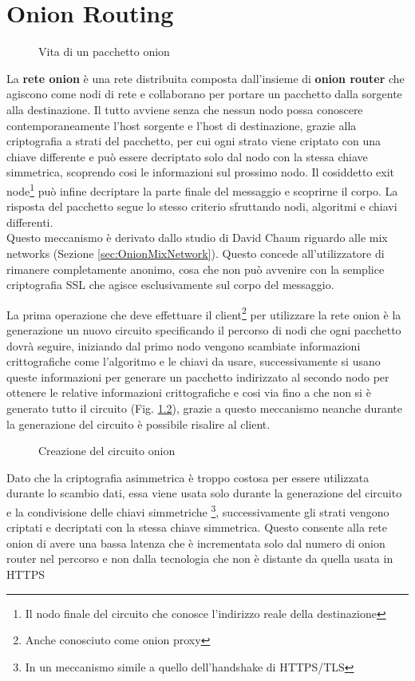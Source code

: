 \chapter{Onion Routing}
\label{chap:Capitolo1}

\begin{figure}[htpb!]
    \centering
    
    \caption{Vita di un pacchetto onion}
    \label{fig:routing}
\end{figure}

La \textbf{rete onion} è una rete distribuita composta dall'insieme di \textbf{onion router} che agiscono come nodi di rete e collaborano per portare un pacchetto dalla sorgente alla destinazione. 
Il tutto avviene senza che nessun nodo possa conoscere contemporaneamente l'host sorgente e l'host di destinazione, grazie alla criptografia a strati del pacchetto, per cui ogni strato viene criptato con una chiave differente e può essere decriptato solo dal nodo con la stessa chiave simmetrica, scoprendo cosi le informazioni sul prossimo nodo. 
Il cosiddetto exit node\footnote{Il nodo finale del circuito che conosce l'indirizzo reale della destinazione} può infine decriptare la parte finale del messaggio e scoprirne il corpo. 
La risposta del pacchetto segue lo stesso criterio sfruttando nodi, algoritmi e chiavi differenti. \\
Questo meccanismo è derivato dallo studio di David Chaum riguardo alle mix networks (Sezione \ref{sec:OnionMixNetwork}).
Questo concede all'utilizzatore di rimanere completamente anonimo, cosa che non può avvenire con la semplice criptografia SSL che agisce esclusivamente sul corpo del messaggio.

\newpage La prima operazione che deve effettuare il client\footnote{Anche conosciuto come onion proxy} per utilizzare la rete onion è la generazione un nuovo circuito specificando il percorso di nodi che ogni pacchetto dovrà seguire, iniziando dal primo nodo vengono scambiate informazioni crittografiche come l'algoritmo e le chiavi da usare, successivamente si usano queste informazioni per generare un pacchetto indirizzato al secondo nodo per ottenere le relative informazioni crittografiche e cosi via fino a che non si è generato tutto il circuito (Fig. \ref{fig:circuitCreation}), grazie a questo meccanismo neanche durante la generazione del circuito è possibile risalire al client. 

\begin{figure}[htpb!]
    \centering
    
    \caption{Creazione del circuito onion}
    \label{fig:circuitCreation}
\end{figure}
Dato che la criptografia asimmetrica è troppo costosa per essere utilizzata durante lo scambio dati, essa viene usata solo durante la generazione del circuito e la condivisione delle chiavi simmetriche \footnote{In un meccanismo simile a quello dell'handshake di HTTPS/TLS}, successivamente gli strati vengono criptati e decriptati con la stessa chiave simmetrica. 
Questo consente alla rete onion di avere una bassa latenza che è incrementata solo dal numero di onion router nel percorso e non dalla tecnologia che non è distante da quella usata in HTTPS 
\cite{OnionRouting}

